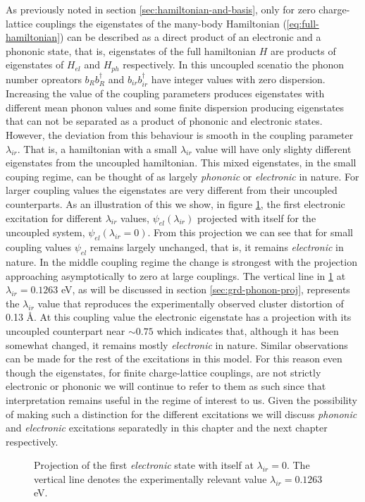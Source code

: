 As previously noted in section \ref{sec:hamiltonian-and-basis}, only for zero charge-lattice couplings the eigenstates of the many-body Hamiltonian (\ref{eq:full-hamiltonian}) can be described as a direct product of an electronic and a phononic state, that is, eigenstates of the full hamiltonian $H$ are products of eigenstates of $H_{el}$ and $H_{ph}$ respectively.
In this uncoupled scenatio the phonon number opreators $b_Rb^\dagger_R$ and $b_{ir}b^\dagger_{ir}$ have integer values with zero dispersion.
Increasing the value of the coupling parameters produces eigenstates with different mean phonon values and some finite dispersion producing eigenstates that can not be separated as a product of phononic and electronic states.
However, the deviation from this behaviour is smooth in the coupling parameter $\lambda_{ir}$.
That is, a hamiltonian with a small $\lambda_{ir}$ value will have only slighty different eigenstates from the uncoupled hamiltonian.
This mixed eigenstates, in the small couping regime, can be thought of as largely \textit{phononic} or \textit{electronic} in nature.
For larger coupling values the eigenstates are very different from their uncoupled counterparts.
As an illustration of this we show, in figure \ref{fig:electr-proj}, the first electronic excitation for different $\lambda_{ir}$ values, $\psi_{el}(\lambda_{ir})$ projected with itself for the uncoupled system, $\psi_{el}(\lambda_{ir}=0)$.
From this projection we can see that for small coupling values $\psi_{el}$ remains largely unchanged, that is, it remains \textit{electronic} in nature.
In the middle coupling regime the change is strongest with the projection approaching asymptotically to zero at large couplings.
The vertical line in \ref{fig:electr-proj} at $\lambda_{ir}=0.1263$ eV, as will be discussed in section \ref{sec:grd-phonon-proj}, represents the $\lambda_{ir}$ value that reproduces the experimentally observed cluster distortion of 0.13 \AA.
At this coupling value the electronic eigenstate has a projection with its uncoupled counterpart near $\sim 0.75$ which indicates that, although it has been somewhat changed, it remains mostly \textit{electronic} in nature.
Similar observations can be made for the rest of the excitations in this model.
For this reason even though the eigenstates, for finite charge-lattice couplings, are not strictly electronic or phononic we will continue to refer to them as such since that interpretation remains useful in the regime of interest to us.
Given the possibility of making such a distinction for the different excitations we will discuss \textit{phononic} and \textit{electronic} excitations separatedly in this chapter and the next chapter respectively. 
%
\begin{figure}[ht]
  \centering
  
  \caption[Projection of the first \textit{electronic} state with itself at $\lambda_{ir}=0$.]
  {Projection of the first \textit{electronic} state with itself at $\lambda_{ir}=0$.
    The vertical line denotes the experimentally relevant value $\lambda_{ir}=0.1263$ eV.}
  \label{fig:electr-proj}
\end{figure}

